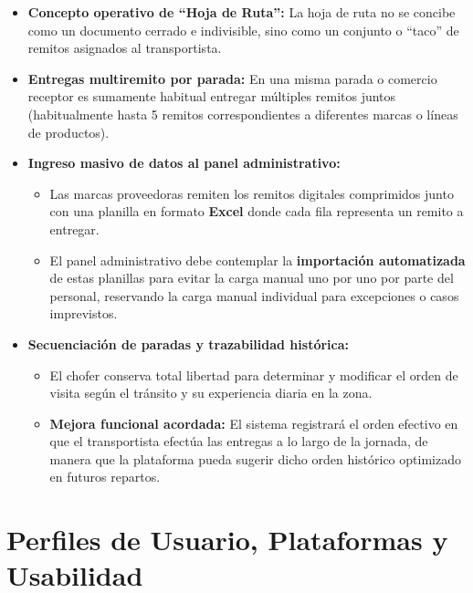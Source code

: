 \documentclass[11pt,a4paper]{article}
\begin{document}
\begin{itemize}
  \item \textbf{Concepto operativo de ``Hoja de Ruta'':} La hoja de ruta no se concibe como un documento cerrado e indivisible, sino como un conjunto o ``taco'' de remitos asignados al transportista.
  \item \textbf{Entregas multiremito por parada:} En una misma parada o comercio receptor es sumamente habitual entregar múltiples remitos juntos (habitualmente hasta 5 remitos correspondientes a diferentes marcas o líneas de productos).
  \item \textbf{Ingreso masivo de datos al panel administrativo:}
  \begin{itemize}
    \item Las marcas proveedoras remiten los remitos digitales comprimidos junto con una planilla en formato \textbf{Excel} donde cada fila representa un remito a entregar.
    \item El panel administrativo debe contemplar la \textbf{importación automatizada} de estas planillas para evitar la carga manual uno por uno por parte del personal, reservando la carga manual individual para excepciones o casos imprevistos.
  \end{itemize}
  \item \textbf{Secuenciación de paradas y trazabilidad histórica:}
  \begin{itemize}
    \item El chofer conserva total libertad para determinar y modificar el orden de visita según el tránsito y su experiencia diaria en la zona.
    \item \textbf{Mejora funcional acordada:} El sistema registrará el orden efectivo en que el transportista efectúa las entregas a lo largo de la jornada, de manera que la plataforma pueda sugerir dicho orden histórico optimizado en futuros repartos.
  \end{itemize}
\end{itemize}

\section{Perfiles de Usuario, Plataformas y Usabilidad}
\end{document}
